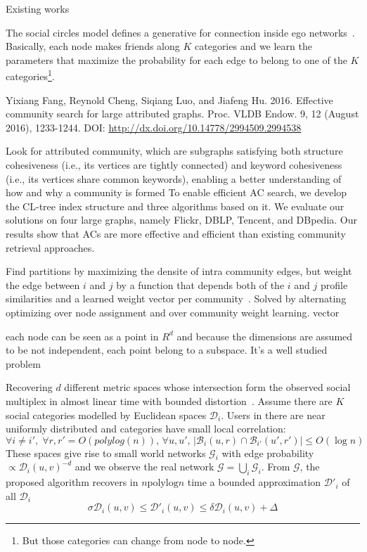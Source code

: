 Existing works ~\autocite{egoNips12}

The social circles model defines a generative for connection inside ego
networks~\autocites{LeskovecEgo12}{LeskovecEgo14}. Basically, each node makes friends along $K$
categories and we learn the parameters that maximize the probability for each edge to belong to one
of the $K$ categories\footnote{But those categories can change from node to node.}.

Yixiang Fang, Reynold Cheng, Siqiang Luo, and Jiafeng Hu. 2016. Effective community search for large
attributed graphs. Proc. VLDB Endow. 9, 12 (August 2016), 1233-1244. DOI:
\url{http://dx.doi.org/10.14778/2994509.2994538}

Look for attributed community,  which are subgraphs satisfying both structure cohesiveness (i.e.,
its vertices are tightly connected) and keyword cohesiveness (i.e., its vertices share common
keywords),  enabling a better understanding of how and why a community is formed
To enable efficient AC search, we develop the CL-tree index structure and three algorithms based on
it. We evaluate our solutions on four large graphs, namely Flickr, DBLP, Tencent, and DBpedia. Our
results show that ACs are more effective and efficient than existing community retrieval approaches.



Find partitions by maximizing the densite of intra community edges, but weight the edge between $i$
and $j$ by a function that depends both of the $i$ and $j$ profile similarities and a learned weight
vector per community~\autocite{ZhangModelFree16}. Solved by alternating optimizing over node
assignment and over community weight learning.
vector 

each node can be seen as a point in $R^d$ and because the dimensions are assumed to be not
independent, each point belong to a subspace. It's a well studied problem~\autocite{SCSurvey11}

Recovering $d$ different metric spaces whose intersection form the observed social multiplex in
almost linear time with bounded distortion~\autocite{Abraham2012a}. Assume there are $K$ social
categories modelled by Euclidean spaces $\mathcal{D}_i$. Users in there are near uniformly
distributed and categories have small local correlation:
\[ \forall i\neq i', \; \forall r, r' = O(polylog(n)),\,
  \forall u, u',\, |\mathcal{B}_i(u, r) \cap \mathcal{B}_{i'}(u', r')| \leq O(\log n) \]
These spaces give rise to small world networks $\mathcal{G}_i$ with edge probability $\propto
\mathcal{D}_i(u, v)^{-d}$ and we observe the real network $\mathcal{G} =\bigcup_i \mathcal{G}_i$.
From $\mathcal{G}$, the proposed algorithm recovers in $n \mathrm{polylog} n$ time a bounded
approximation $\mathcal{D}'_i$ of all $\mathcal{D}_i$
\[ \sigma \mathcal{D}_i(u, v) \leq \mathcal{D}'_i(u, v) \leq \delta \mathcal{D}_i(u, v) + \Delta \]

